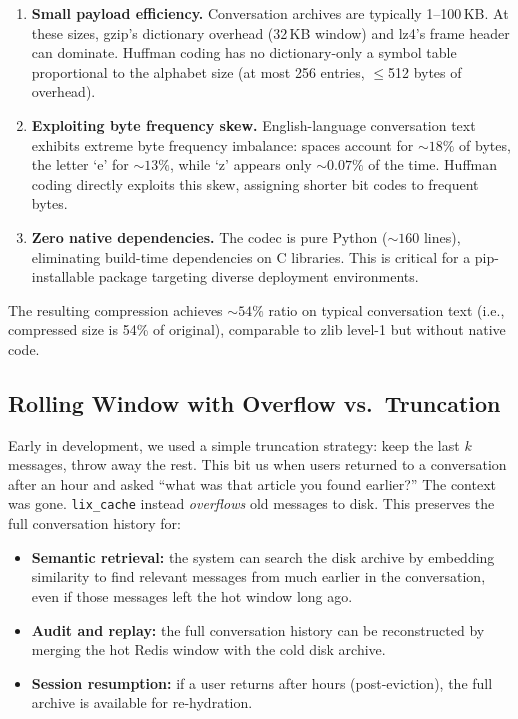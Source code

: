 \documentclass[conference]{IEEEtran}
\begin{document}
\begin{enumerate}
\item \textbf{Small payload efficiency.} Conversation archives are typically 1--100\,KB. At these sizes, gzip's dictionary overhead (32\,KB window) and lz4's frame header can dominate. Huffman coding has no dictionary-only a symbol table proportional to the alphabet size (at most 256 entries, $\leq$512 bytes of overhead).

\item \textbf{Exploiting byte frequency skew.} English-language conversation text exhibits extreme byte frequency imbalance: spaces account for ${\sim}18\%$ of bytes, the letter `e' for ${\sim}13\%$, while `z' appears only ${\sim}0.07\%$ of the time. Huffman coding directly exploits this skew, assigning shorter bit codes to frequent bytes.

\item \textbf{Zero native dependencies.} The codec is pure Python (${\sim}160$ lines), eliminating build-time dependencies on C libraries. This is critical for a pip-installable package targeting diverse deployment environments.
\end{enumerate}

The resulting compression achieves ${\sim}54\%$ ratio on typical conversation text (i.e., compressed size is 54\% of original), comparable to zlib level-1 but without native code.

\subsection{Rolling Window with Overflow vs.\ Truncation}

Early in development, we used a simple truncation strategy: keep the last $k$ messages, throw away the rest. This bit us when users returned to a conversation after an hour and asked ``what was that article you found earlier?'' The context was gone. \texttt{lix\_cache} instead \emph{overflows} old messages to disk. This preserves the full conversation history for:

\begin{itemize}
\item \textbf{Semantic retrieval:} the system can search the disk archive by embedding similarity to find relevant messages from much earlier in the conversation, even if those messages left the hot window long ago.
\item \textbf{Audit and replay:} the full conversation history can be reconstructed by merging the hot Redis window with the cold disk archive.
\item \textbf{Session resumption:} if a user returns after hours (post-eviction), the full archive is available for re-hydration.
\end{itemize}
\end{document}
